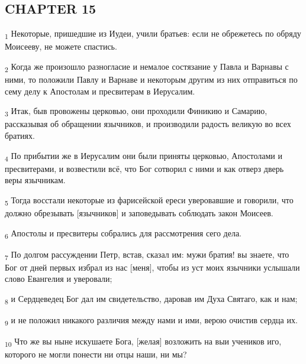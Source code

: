 \subsection{CHAPTER 15}
\begin{tcolorbox}
\textsubscript{1} Некоторые, пришедшие из Иудеи, учили братьев: если не обрежетесь по обряду Моисееву, не можете спастись.
\end{tcolorbox}
\begin{tcolorbox}
\textsubscript{2} Когда же произошло разногласие и немалое состязание у Павла и Варнавы с ними, то положили Павлу и Варнаве и некоторым другим из них отправиться по сему делу к Апостолам и пресвитерам в Иерусалим.
\end{tcolorbox}
\begin{tcolorbox}
\textsubscript{3} Итак, быв провожены церковью, они проходили Финикию и Самарию, рассказывая об обращении язычников, и производили радость великую во всех братиях.
\end{tcolorbox}
\begin{tcolorbox}
\textsubscript{4} По прибытии же в Иерусалим они были приняты церковью, Апостолами и пресвитерами, и возвестили всё, что Бог сотворил с ними и как отверз дверь веры язычникам.
\end{tcolorbox}
\begin{tcolorbox}
\textsubscript{5} Тогда восстали некоторые из фарисейской ереси уверовавшие и говорили, что должно обрезывать [язычников] и заповедывать соблюдать закон Моисеев.
\end{tcolorbox}
\begin{tcolorbox}
\textsubscript{6} Апостолы и пресвитеры собрались для рассмотрения сего дела.
\end{tcolorbox}
\begin{tcolorbox}
\textsubscript{7} По долгом рассуждении Петр, встав, сказал им: мужи братия! вы знаете, что Бог от дней первых избрал из нас [меня], чтобы из уст моих язычники услышали слово Евангелия и уверовали;
\end{tcolorbox}
\begin{tcolorbox}
\textsubscript{8} и Сердцеведец Бог дал им свидетельство, даровав им Духа Святаго, как и нам;
\end{tcolorbox}
\begin{tcolorbox}
\textsubscript{9} и не положил никакого различия между нами и ими, верою очистив сердца их.
\end{tcolorbox}
\begin{tcolorbox}
\textsubscript{10} Что же вы ныне искушаете Бога, [желая] возложить на выи учеников иго, которого не могли понести ни отцы наши, ни мы?
\end{tcolorbox}

